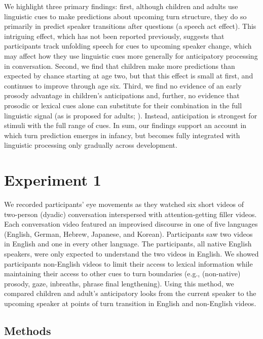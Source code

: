 \documentclass[authoryear, 12pt]{elsarticle}
\begin{document}
We highlight three primary findings: first, although children and adults use linguistic cues to make predictions about upcoming turn structure, they do so primarily in predict speaker transitions after questions (a speech act effect). This intriguing effect, which has not been reported previously, suggests that participants track unfolding speech for cues to upcoming speaker change, which may affect how they use linguistic cues more generally for anticipatory processing in conversation. Second, we find that children make more predictions than expected by chance starting at age two, but that this effect is small at first, and continues to improve through age six. Third, we find no evidence of an early prosody advantage in children's anticipations and, further, no evidence that prosodic or lexical cues alone can substitute for their combination in the full linguistic signal (as is proposed for adults; \citealp{de-ruiter2006}). Instead, anticipation is strongest for stimuli with the full range of cues. In sum, our findings support an account in which turn prediction emerges in infancy, but becomes fully integrated with linguistic processing only gradually across development.

\section{Experiment 1}
\label{sec:exp1}

We recorded participants' eye movements as they watched six short videos of two-person (dyadic) conversation interspersed with attention-getting filler videos. Each conversation video featured an improvised discourse in one of five languages (English, German, Hebrew, Japanese, and Korean). Participants saw two videos in English and one in every other language. The participants, all native English speakers, were only expected to understand the two videos in English. We showed participants non-English videos to limit their access to lexical information while maintaining their access to other cues to turn boundaries (e.g., (non-native) prosody, gaze, inbreaths, phrase final lengthening). Using this method, we compared children and adult's anticipatory looks from the current speaker to the upcoming speaker at points of turn transition in English and non-English videos.

\subsection{Methods}
\label{sec:methods1}
\end{document}
